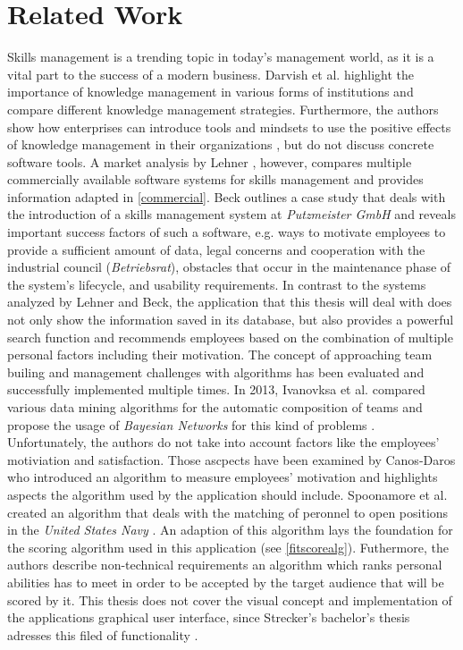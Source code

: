 \chapter{Related Work}

Skills management is a trending topic in today's management world, as it is a vital part to the success of a modern business.
Darvish et al. highlight the importance of knowledge management in various forms of institutions and compare different knowledge management strategies.
Furthermore, the authors show how enterprises can introduce tools and mindsets to use the positive effects of knowledge management in their organizations \cite{darvish}, but do not discuss concrete software tools.
A market analysis by Lehner \cite{Marktanalyse}, however, compares multiple commercially available software systems for skills management and provides information adapted in \ref{commercial}.
\newline
Beck outlines a case study that deals with the introduction of a skills management system at \textit{Putzmeister GmbH} \cite{beck} and reveals important success factors of such a software, e.g. ways to motivate employees to provide a sufficient amount of data, legal concerns and cooperation with the industrial council (\textit{Betriebsrat}), obstacles that occur in the maintenance phase of the system's lifecycle, and usability requirements.
\newline
In contrast to the systems analyzed by Lehner and Beck, the application that this thesis will deal with does not only
show the information saved in its database, but also provides a powerful search function and recommends employees based on the combination of multiple personal factors including their motivation.
\newline
The concept of approaching team builing and management challenges with algorithms has been evaluated and successfully implemented multiple times.
In 2013, Ivanovksa et al. compared various data mining algorithms for the automatic composition of teams and propose the usage of \textit{Bayesian Networks} for this kind of problems \cite{ivanovska}. Unfortunately, the authors do not take into account factors like the employees' motiviation and satisfaction. Those ascpects have been examined by Canos-Daros who introduced an algorithm to measure employees' motivation \cite{CanosDaros2013} and highlights aspects the algorithm used by the application should include.
Spoonamore et al. created an algorithm that deals with the matching of peronnel to open positions in the \textit{United States Navy} \cite{USN}. An adaption of this algorithm lays the foundation for the scoring algorithm used in this application (see \ref{fitscorealg}). Futhermore, the authors describe non-technical requirements an algorithm which ranks personal abilities has to
meet in order to be accepted by the target audience that will be scored by it.
\newline
This thesis does not cover the visual concept and implementation of the applications graphical user interface, since
Strecker's bachelor's thesis adresses this filed of functionality \cite{strecker}.
